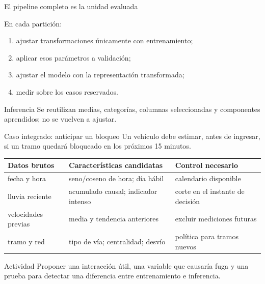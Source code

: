 \documentclass[aspectratio=169,10pt]{beamer}
\newcommand{\br}{\\}
\begin{document}
\begin{frame}{El pipeline completo es la unidad evaluada}
  \footnotesize
  \begin{center}
  \end{center}
  En cada partición:
  \begin{enumerate}
    \item ajustar transformaciones únicamente con entrenamiento;
    \item aplicar esos parámetros a validación;
    \item ajustar el modelo con la representación transformada;
    \item medir sobre los casos reservados.
  \end{enumerate}
  \begin{block}{Inferencia}
    Se reutilizan medias, categorías, columnas seleccionadas y componentes aprendidos; no se vuelven a ajustar.
  \end{block}
\end{frame}

\begin{frame}{Caso integrado: anticipar un bloqueo}
  \scriptsize
  Un vehículo debe estimar, antes de ingresar, si un tramo quedará bloqueado en los próximos 15 minutos.
  \begin{tabularx}{\textwidth}{p{} p{} X}
    \toprule Datos brutos & Características candidatas & Control necesario \\ \midrule
    fecha y hora & seno/coseno de hora; día hábil & calendario disponible \\
    lluvia reciente & acumulado causal; indicador intenso & corte en el instante de decisión \\
    velocidades previas & media y tendencia anteriores & excluir mediciones futuras \\
    tramo y red & tipo de vía; centralidad; desvío & política para tramos nuevos \\
    \bottomrule
  \end{tabularx}
  \begin{block}{Actividad}
    Proponer una interacción útil, una variable que causaría fuga y una prueba para detectar una diferencia entre entrenamiento e inferencia.
  \end{block}
\end{frame}
\end{document}
